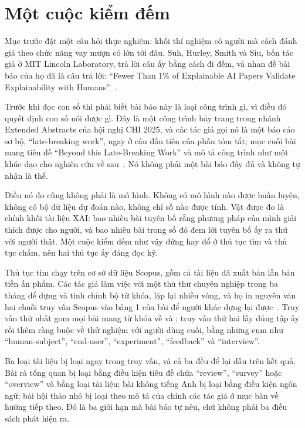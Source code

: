 \section{Một cuộc kiểm đếm}
\label{sec:ch12-mot-cuoc-kiem-dem}

%
Mục trước đặt một câu hỏi thực nghiệm: khối thí nghiệm có người mà cách đánh
giá theo chức năng vay mượn có lớn tới đâu. Suh, Hurley, Smith và Siu, bốn tác
giả ở MIT Lincoln Laboratory, trả lời câu ấy bằng cách đi đếm, và nhan đề bài
báo của họ đã là câu trả lời: \enquote{Fewer Than 1\% of Explainable AI Papers
Validate Explainability with Humans}~\autocite{p24humangap}.

Trước khi đọc con số thì phải biết bài báo này là loại công trình gì, vì điều
đó quyết định con số nói được gì. Đây là một công trình bảy trang trong nhánh
Extended Abstracts của hội nghị CHI 2025, và các tác giả gọi nó là một báo cáo
sơ bộ, \enquote{late-breaking work}, ngay ở câu đầu tiên của phần tóm tắt; mục
cuối bài mang tiêu đề \enquote{Beyond this Late-Breaking Work} và mô tả công
trình như một khúc dạo cho nghiên cứu về sau~\autocite{p24humangap}. Nó không
phải một bài báo đầy đủ và không tự nhận là thế.

%
Điều nó đo cũng không phải là mô hình. Không có mô hình nào được huấn luyện,
không có bộ dữ liệu dự đoán nào, không chỉ số nào được tính. Vật được đo là
chính khối tài liệu XAI: bao nhiêu bài tuyên bố rằng phương pháp của mình giải
thích được cho người, và bao nhiêu bài trong số đó đem lời tuyên bố ấy ra thử
với người thật. Một cuộc kiểm đếm như vậy đứng hay đổ ở thủ tục tìm và thủ tục
chấm, nên hai thủ tục ấy đáng đọc kỹ.

%
Thủ tục tìm chạy trên cơ sở dữ liệu Scopus, gồm cả tài liệu đã xuất bản lẫn
bản tiền ấn phẩm. Các tác giả làm việc với một thủ thư chuyên nghiệp trong ba
tháng để dựng và tinh chỉnh bộ từ khóa, lặp lại nhiều vòng, và họ in nguyên
văn hai chuỗi truy vấn Scopus vào bảng 1 của bài để người khác dựng
lại được~\autocite{p24humangap}. Truy vấn thứ nhất gom mọi bài mang từ khóa về
 và
; truy vấn thứ hai lấy đúng tập ấy
rồi thêm ràng buộc về thử nghiệm với người dùng cuối, bằng những cụm như
\enquote{human-subject}, \enquote{end-user}, \enquote{experiment},
\enquote{feedback} và \enquote{interview}.

Ba loại tài liệu bị loại ngay trong truy vấn, và cả ba đều để lại dấu trên kết
quả. Bài rà tổng quan bị loại bằng điều kiện tiêu đề chứa \enquote{review},
\enquote{survey} hoặc \enquote{overview} và bằng loại tài liệu; bài không
tiếng Anh bị loại bằng điều kiện ngôn ngữ; bài hội thảo nhỏ bị loại theo mô tả
của chính các tác giả ở mục bàn về hướng tiếp theo. Đó là ba giới hạn mà bài
báo tự nêu, chứ không phải ba điều sách phát hiện ra.

